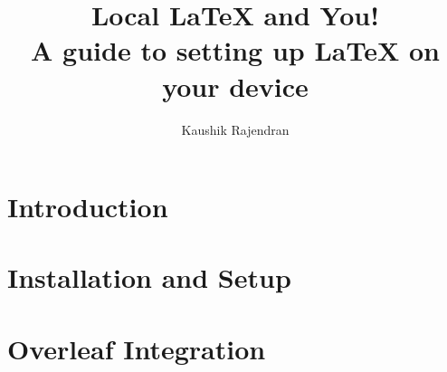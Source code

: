 \documentclass[titlepage]{article}
\title{\textbf{Local \LaTeX{} and You!} \\ A guide to setting up \LaTeX{} on your device}
\author{Kaushik Rajendran}
\begin{document}
\maketitle
\tableofcontents
\newpage

\section{Introduction}

\clearpage

\section{Installation and Setup}



\section{Overleaf Integration}

\clearpage
\end{document}
